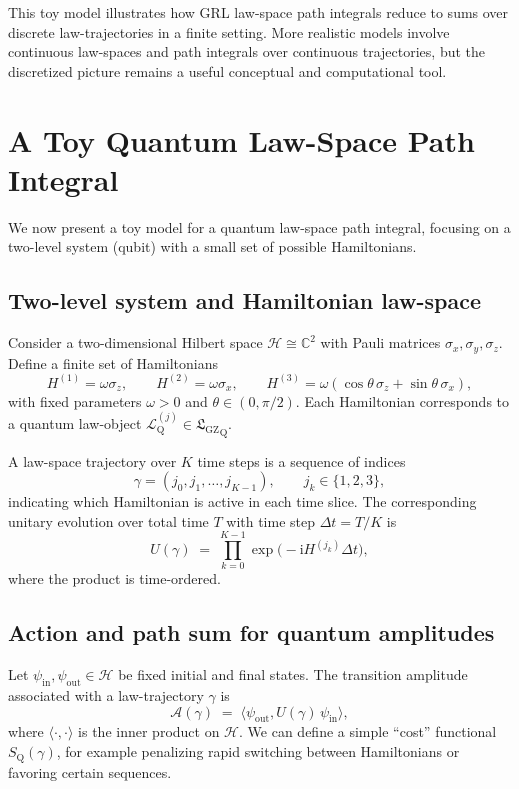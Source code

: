 \documentclass[11pt]{book}
\newcommand{\GZLS}{\ensuremath{\mathfrak{L}_{\mathrm{GZ}}}}
\theoremstyle{plain}
\theoremstyle{definition}
\theoremstyle{remark}
\begin{document}
This toy model illustrates how GRL law-space path integrals reduce
to sums over discrete law-trajectories in a finite setting. More
realistic models involve continuous law-spaces and path integrals
over continuous trajectories, but the discretized picture remains a
useful conceptual and computational tool.

\section{A Toy Quantum Law-Space Path Integral}
\label{sec:toy-quantum-lawspace-pi}


We now present a toy model for a quantum law-space path integral,
focusing on a two-level system (qubit) with a small set of possible
Hamiltonians.

\subsection*{Two-level system and Hamiltonian law-space}

Consider a two-dimensional Hilbert space $\mathcal{H} \cong
\mathbb{C}^2$ with Pauli matrices $\sigma_x,\sigma_y,\sigma_z$.
Define a finite set of Hamiltonians
\[
   H^{(1)} = \omega \sigma_z,
   \qquad
   H^{(2)} = \omega \sigma_x,
   \qquad
   H^{(3)} = \omega (\cos\theta\,\sigma_z + \sin\theta\,\sigma_x),
\]
with fixed parameters $\omega > 0$ and $\theta \in (0,\pi/2)$.
Each Hamiltonian corresponds to a quantum law-object
$\mathcal{L}_{\mathrm{Q}}^{(j)} \in {\GZLS}_{\mathrm{Q}}$.

A law-space trajectory over $K$ time steps is a sequence of indices
\[
   \gamma = (j_0,j_1,\dots,j_{K-1}),
   \qquad j_k \in \{1,2,3\},
\]
indicating which Hamiltonian is active in each time slice. The
corresponding unitary evolution over total time $T$ with time step
$\Delta t = T/K$ is
\[
   U(\gamma)
   \;=\;
   \prod_{k=0}^{K-1}
   \exp\!\bigl(-\mathrm{i} H^{(j_k)} \Delta t\bigr),
\]
where the product is time-ordered.

\subsection*{Action and path sum for quantum amplitudes}

Let $\psi_{\mathrm{in}},\psi_{\mathrm{out}} \in \mathcal{H}$ be
fixed initial and final states. The transition amplitude associated
with a law-trajectory $\gamma$ is
\[
   \mathcal{A}(\gamma)
   \;=\;
   \bigl\langle \psi_{\mathrm{out}},
   U(\gamma)\,\psi_{\mathrm{in}}\bigr\rangle,
\]
where $\langle \cdot,\cdot\rangle$ is the inner product on
$\mathcal{H}$. We can define a simple ``cost'' functional
$S_{\mathrm{Q}}(\gamma)$, for example penalizing rapid switching
between Hamiltonians or favoring certain sequences.
\end{document}

